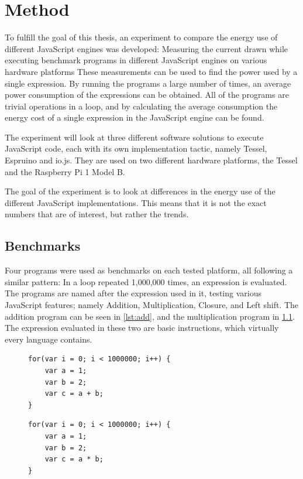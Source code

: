 \chapter{Method}
\label{chap:chapter3}

To fulfill the goal of this thesis, an experiment to compare the energy use of different JavaScript engines was developed:
Measuring the current drawn while executing benchmark programs in different JavaScript engines on various hardware platforms
These measurements can be used to find the power used by a single expression.
By running the programs a large number of times, an average power consumption of the expressions can be obtained.
All of the programs are trivial operations in a loop, and by calculating the average consumption the energy cost of a single expression in the JavaScript engine can be found.

The experiment will look at three different software solutions to execute JavaScript code, each with its own implementation tactic, namely Tessel, Espruino and io.js.
They are used on two different hardware platforms, the Tessel and the Raspberry Pi 1 Model B.

The goal of the experiment is to look at differences in the energy use of the different JavaScript implementations.
This means that it is not the exact numbers that are of interest, but rather the trends.

\section{Benchmarks}
Four programs were used as benchmarks on each tested platform, all following a similar pattern: In a loop repeated 1,000,000 times, an expression is evaluated.
The programs are named after the expression used in it, testing various JavaScript features; namely Addition, Multiplication, Closure, and Left shift.
The addition program can be seen in \cref{lst:add}, and the multiplication program in \cref{lst:multi}.
The expression evaluated in these two are basic instructions, which virtually every language contains.

\begin{figure}[h!]
\begin{minipage}{0.45\textwidth}
\begin{verbatim}
for(var i = 0; i < 1000000; i++) {
    var a = 1;
    var b = 2;
    var c = a + b;
}
\end{verbatim}
\label{lst:add}
\end{minipage}\hfill
\begin{minipage}{0.45\textwidth}
\begin{verbatim}
for(var i = 0; i < 1000000; i++) {
    var a = 1;
    var b = 2;
    var c = a * b;
}
\end{verbatim}
\label{lst:multi}
\end{minipage}
\end{figure}

